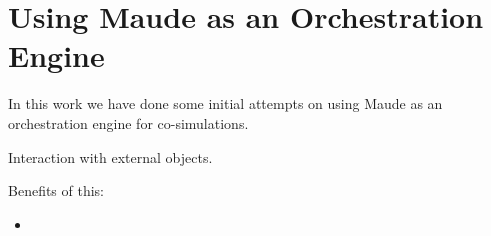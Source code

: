 \section{Using Maude as an Orchestration Engine}
In this work we have done some initial attempts on using Maude as an orchestration engine for co-simulations.


Interaction with external objects.

Benefits of this:
\begin{itemize}
    \item 
\end{itemize}

